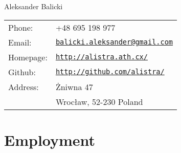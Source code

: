 \documentclass[letterpaper]{article}
\def\name{Aleksander Balicki}
\begin{document}
{\huge \name}


\vspace{0.25in}

\begin{minipage}{0.45\linewidth}
  \begin{tabular}{ll}
    Phone: 	& +48 695 198 977 \\
    Email: 	& \href{mailto:balicki.aleksander@gmail.com}{\tt balicki.aleksander@gmail.com} \\
    Homepage: 	& \href{http://alistra.ath.cx/}{\tt http://alistra.ath.cx/} \\
    Github:     & \href{http://github.com/alistra/}{\tt http://github.com/alistra/}\\
    Address: 	& Żniwna 47\\
    		& Wrocław, 52-230 Poland
  \end{tabular}
\end{minipage}

\section*{Employment}
\end{document}
